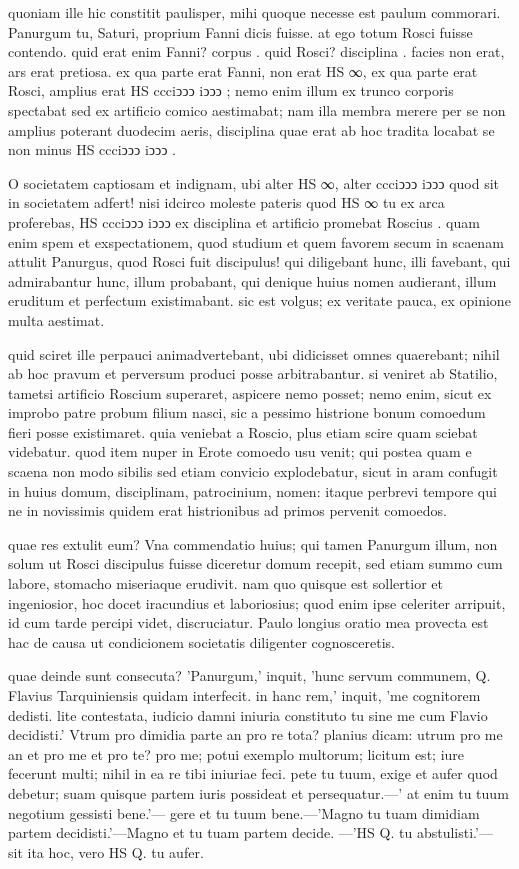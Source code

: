  quoniam ille hic constitit paulisper, mihi quoque necesse est paulum commorari. Panurgum tu, Saturi, proprium Fanni dicis fuisse. at ego totum Rosci fuisse contendo. quid erat enim Fanni? corpus . quid Rosci? disciplina . facies non erat, ars erat pretiosa. ex qua parte erat Fanni, non erat HS ∞, ex qua parte erat Rosci, amplius erat HS ccciↄↄↄ iↄↄↄ ; nemo enim illum ex trunco corporis spectabat sed ex artificio comico aestimabat; nam illa membra merere per se non amplius poterant duodecim aeris, disciplina quae erat ab hoc tradita locabat se non minus HS ccciↄↄↄ iↄↄↄ .

 O societatem captiosam et indignam, ubi alter HS ∞, alter ccciↄↄↄ iↄↄↄ quod sit in societatem adfert! nisi idcirco moleste pateris quod HS ∞ tu ex arca proferebas, HS ccciↄↄↄ iↄↄↄ ex disciplina et artificio promebat Roscius . quam enim spem et exspectationem, quod studium et quem favorem secum in scaenam attulit Panurgus, quod Rosci fuit discipulus! qui diligebant hunc, illi favebant, qui admirabantur hunc, illum probabant, qui denique huius nomen audierant, illum eruditum et perfectum existimabant. sic est volgus; ex veritate pauca, ex opinione multa aestimat.

 quid sciret ille perpauci animadvertebant, ubi didicisset omnes quaerebant; nihil ab hoc pravum et perversum produci posse arbitrabantur. si veniret ab Statilio, tametsi artificio Roscium superaret, aspicere nemo posset; nemo enim, sicut ex improbo patre probum filium nasci, sic a pessimo histrione bonum comoedum fieri posse existimaret. quia veniebat a Roscio, plus etiam scire quam sciebat videbatur. quod item nuper in Erote comoedo usu venit; qui postea quam e scaena non modo sibilis sed etiam convicio explodebatur, sicut in aram confugit in huius domum, disciplinam, patrocinium, nomen: itaque perbrevi tempore qui ne in novissimis quidem erat histrionibus ad primos pervenit comoedos.

 quae res extulit eum? Vna commendatio huius; qui tamen Panurgum illum, non solum ut Rosci discipulus fuisse diceretur domum recepit, sed etiam summo cum labore, stomacho miseriaque erudivit. nam quo quisque est sollertior et ingeniosior, hoc docet iracundius et laboriosius; quod enim ipse celeriter arripuit, id cum tarde percipi videt, discruciatur. Paulo longius oratio mea provecta est hac de causa ut condicionem societatis diligenter cognosceretis.

 quae deinde sunt consecuta? 'Panurgum,' inquit, 'hunc servum communem, Q. Flavius Tarquiniensis quidam interfecit. in hanc rem,' inquit, 'me cognitorem dedisti. lite contestata, iudicio damni iniuria constituto tu sine me cum Flavio decidisti.' Vtrum pro dimidia parte an pro re tota? planius dicam: utrum pro me an et pro me et pro te? pro me; potui exemplo multorum; licitum est; iure fecerunt multi; nihil in ea re tibi iniuriae feci. pete tu tuum, exige et aufer quod debetur; suam quisque partem iuris possideat et persequatur.—' at enim tu tuum negotium gessisti bene.'— gere et tu tuum bene.—'Magno tu tuam dimidiam partem decidisti.'—Magno et tu tuam partem decide. —'HS Q. tu abstulisti.'— sit ita hoc, vero HS Q. tu aufer.

